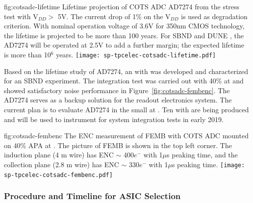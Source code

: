 \begin{dunefigure}
{fig:cotsadc-lifetime}
	{Lifetime projection of COTS ADC AD7274 from the stress test with V$_{DD} >$ 5V. The current drop of 1\% on the V$_{DD}$ is used as degradation criterion. With nominal operation voltage of 3.6V for 350nm CMOS technology, the lifetime is projected to be more than 100 years. For SBND and DUNE , the AD7274 will be operated at 2.5V to add a further margin; the expected lifetime is more than 10$^6$ years.}
\texttt{[image: sp-tpcelec-cotsadc-lifetime.pdf]}
\end{dunefigure}

Based on the lifetime study of AD7274, an  with   was developed and characterized for an SBND experiment. The integration test was carried out with 40\%  at  and showed satisfactory noise performance in Figure~\ref{fig:cotsadc-fembenc}. The   AD7274 serves as a backup solution for the    readout electronics system. The current plan is to evaluate AD7274  in the small   at . Ten  with   are being produced and will be used to instrument   for system integration tests in early 2019. 

\begin{dunefigure}
{fig:cotsadc-fembenc}
	{The ENC measurement of FEMB with COTS ADC mounted on 40\% APA at . The picture of FEMB is shown in the top left corner. The induction plane (4 m wire) has ENC $\sim$ 400$e^-$ with 1$\mu$s peaking time, and the collection plane (2.8 m wire) has ENC $\sim$ 330$e^-$ with 1$\mu$s peaking time.}
\texttt{[image: sp-tpcelec-cotsadc-fembenc.pdf]}
\end{dunefigure}

\subsubsection{Procedure and Timeline for ASIC Selection}
\label{sec:fdsp-tpcelec-design-femb-selection}

